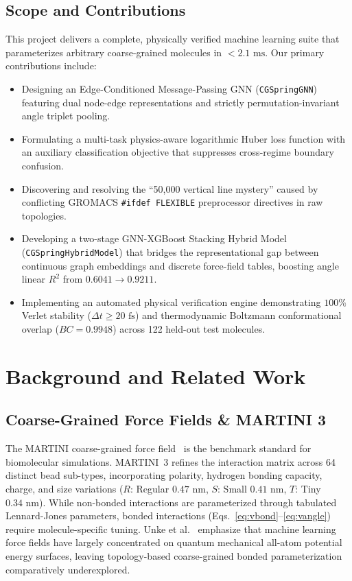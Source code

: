\documentclass[10pt,journal,compsoc]{IEEEtran}
\begin{document}
\subsection{Scope and Contributions}
This project delivers a complete, physically verified machine learning suite that parameterizes arbitrary coarse-grained molecules in $< 2.1\text{ ms}$. Our primary contributions include:
\begin{itemize}
    \item Designing an Edge-Conditioned Message-Passing GNN (\texttt{CGSpringGNN}) featuring dual node-edge representations and strictly permutation-invariant angle triplet pooling.
    \item Formulating a multi-task physics-aware logarithmic Huber loss function with an auxiliary classification objective that suppresses cross-regime boundary confusion.
    \item Discovering and resolving the ``50,000 vertical line mystery'' caused by conflicting GROMACS \texttt{\#ifdef FLEXIBLE} preprocessor directives in raw topologies.
    \item Developing a two-stage GNN-XGBoost Stacking Hybrid Model (\texttt{CGSpringHybridModel}) that bridges the representational gap between continuous graph embeddings and discrete force-field tables, boosting angle linear $R^2$ from $0.6041 \to \mathbf{0.9211}$.
    \item Implementing an automated physical verification engine demonstrating $100\%$ Verlet stability ($\Delta t \ge 20\text{ fs}$) and thermodynamic Boltzmann conformational overlap ($BC = 0.9948$) across 122 held-out test molecules.
\end{itemize}

\section{Background and Related Work}
\label{sec:background}

\subsection{Coarse-Grained Force Fields \& MARTINI 3}
The MARTINI coarse-grained force field~\cite{marrink2007martini,souza2021martini3} is the benchmark standard for biomolecular simulations. MARTINI~3 refines the interaction matrix across 64 distinct bead sub-types, incorporating polarity, hydrogen bonding capacity, charge, and size variations ($R$: Regular $0.47\text{ nm}$, $S$: Small $0.41\text{ nm}$, $T$: Tiny $0.34\text{ nm}$). While non-bonded interactions are parameterized through tabulated Lennard-Jones parameters, bonded interactions (Eqs.~\ref{eq:vbond}--\ref{eq:vangle}) require molecule-specific tuning. Unke et al.~\cite{unke2021machine} emphasize that machine learning force fields have largely concentrated on quantum mechanical all-atom potential energy surfaces, leaving topology-based coarse-grained bonded parameterization comparatively underexplored.
\end{document}
